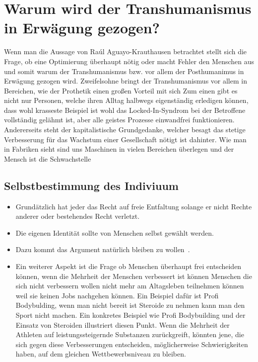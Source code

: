\documentclass[a4paper,
DIV=13,
12pt,
BCOR=10mm,
department=FakEI,
twoside,
parskip=half,
automark,
]{OTHRartcl}
\begin{document}
\section*{Warum wird der Transhumanismus in Erwägung gezogen?}
Wenn man die Aussage von Raúl Aguayo-Krauthausen betrachtet stellt sich die Frage, ob eine Optimierung überhaupt nötig oder macht Fehler den Menschen aus und somit warum der Transhumanismus bzw. vor allem der Posthumanimus
in Erwägung gezogen wird. Zweifelsohne bringt der Transhumanismus vor allem in Bereichen, wie der Prothetik einen großen Vorteil mit sich 
Zum einen gibt es nicht nur Personen, welche ihren Alltag halbwegs eigenständig erledigen können, dass wohl krasseste Beispiel ist wohl das Locked-In-Syndrom bei der Betroffene vollständig gelähmt
ist, aber alle geistes Prozesse einwandfrei funktionieren. Andererseits steht der kapitalistische Grundgedanke, welcher besagt das stetige Verbesserung für das Wachstum einer Gesellschaft nötigt ist dahinter. Wie man in
Fabriken sieht sind uns Maschinen in vielen Bereichen überlegen und der Mensch ist die Schwachstelle

\subsection*{Selbstbestimmung des Indiviuum}

\begin{itemize}
    \item Grundätzlich hat jeder das Recht auf freie Entfaltung solange er nicht Rechte anderer oder bestehendes Recht verletzt\cite{fur1996grundgesetz}. 
    \item Die eigenen Identität sollte von Menschen selbst gewählt werden. 
    \item Dazu kommt das Argument natürlich bleiben zu wollen~\cite{lee2016cochlear}.
    \item Ein weiterer Aspekt ist die Frage ob Menschen überhaupt frei entscheiden können, wenn die Mehrheit der Menschen verbessert ist können Menschen die sich nicht verbessern wollen 
    nicht mehr am Altagsleben teilnehmen können weil sie keinen Jobs nachgehen können. Ein Beispiel dafür ist Profi Bodybulding, wenn man nicht bereit ist Steroide zu nehmen kann man
    den Sport nicht machen. Ein konkretes Beispiel wie Profi Bodybuilding und der Einsatz von Steroiden illustriert diesen Punkt. Wenn die Mehrheit der Athleten auf leistungssteigernde 
    Substanzen zurückgreift, könnten jene, die sich gegen diese Verbesserungen entscheiden, möglicherweise Schwierigkeiten haben, auf dem gleichen Wettbewerbsniveau zu bleiben.
\end{itemize}
\end{document}
